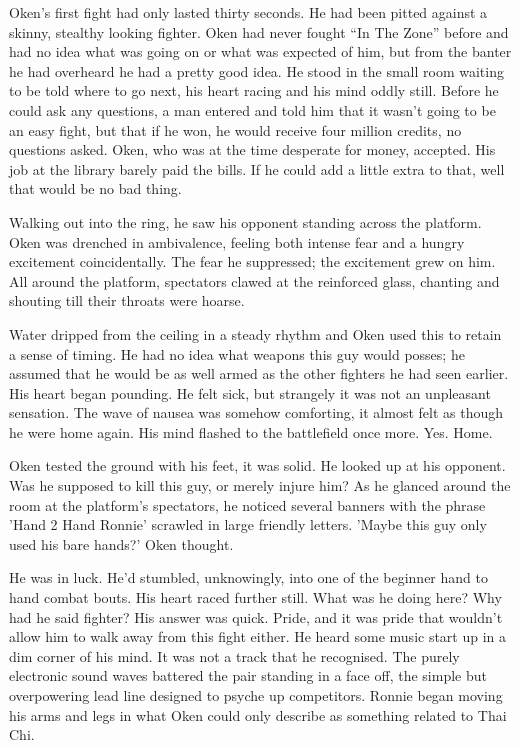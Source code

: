 \thoughtbreak

Oken's first fight had only lasted thirty seconds. He had been pitted against a skinny, stealthy looking fighter. Oken had never fought ``In The Zone'' before and had no idea what was going on or what was expected of him, but from the banter he had overheard he had a pretty good idea. He stood in the small room waiting to be told where to go next, his heart racing and his mind oddly still. Before he could ask any questions, a man entered and told him that it wasn't going to be an easy fight, but that if he won, he would receive four million credits, no questions asked. Oken, who was at the time desperate for money, accepted. His job at the library barely paid the bills. If he could add a little extra to that, well that would be no bad thing.

Walking out into the ring, he saw his opponent standing across the platform. Oken was drenched in ambivalence, feeling both intense fear and a hungry excitement coincidentally. The fear he suppressed; the excitement grew on him. All around the platform, spectators clawed at the reinforced glass, chanting and shouting till their throats were hoarse.

Water dripped from the ceiling in a steady rhythm and Oken used this to retain a sense of timing. He had no idea what weapons this guy would posses; he assumed that he would be as well armed as the other fighters he had seen earlier. His heart began pounding. He felt sick, but strangely it was not an unpleasant sensation. The wave of nausea was somehow comforting, it almost felt as though he were home again. His mind flashed to the battlefield once more. Yes. Home.

 Oken tested the ground with his feet, it was solid. He looked up at his opponent. Was he supposed to kill this guy, or merely injure him? As he glanced around the room at the platform's spectators, he noticed several banners with the phrase 'Hand 2 Hand Ronnie' scrawled in large friendly letters. 'Maybe this guy only used his bare hands?' Oken thought.

He was in luck. He'd stumbled, unknowingly, into one of the beginner hand to hand combat bouts. His heart raced further still. What was he doing here? Why had he said fighter? His answer was quick. Pride, and it was pride that wouldn't allow him to walk away from this fight either. He heard some music start up in a dim corner of his mind. It was not a track that he recognised. The purely electronic sound waves battered the pair standing in a face off, the simple but overpowering lead line designed to psyche up competitors. Ronnie began moving his arms and legs in what Oken could only describe as something related to Thai Chi.

